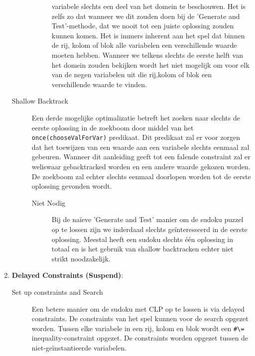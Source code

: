 \begin{enumerate}
\begin{description}
\begin{description}
                        variabele slechts een deel van het domein te beschouwen. Het is zelfs zo
                        dat wanneer we dit zouden doen bij de 'Generate and Test'-methode, dat we
                        nooit tot een juiste oplossing zouden kunnen komen. Het is immers inherent
                        aan het spel dat binnen de rij, kolom of blok alle variabelen een verschillende
                        waarde moeten hebben. Wanneer we telkens slechts de eerste helft van het domein
                        zouden bekijken wordt het niet mogelijk om voor elk van de negen variabelen
                        uit die rij,kolom of blok een verschillende waarde te vinden.
                \end{description}
        \item[Shallow Backtrack]
                Een derde mogelijke optimalizatie betreft het zoeken naar slechts de eerste oplossing in 
                de zoekboom door middel van het \verb|once(chooseValForVar)| predikaat. Dit predikaat
                zal er voor zorgen dat het toewijzen van een waarde aan een variabele slechts eenmaal
                zal gebeuren. Wanneer dit aanleiding geeft tot een falende constraint zal er weliswaar
                gebacktracked worden en een andere waarde gekozen worden. De zoekboom zal echter
                slechts eenmaal doorlopen worden tot de eerste oplossing gevonden wordt.
                \begin{description}
                \item[Niet Nodig] Bij de na\"ieve 'Generate and Test' manier om de sudoku puzzel op te lossen zijn we inderdaad slechts ge\"interesseerd
                        in de eerste oplossing. Meestal heeft een sudoku slechts \'e\'en oplossing in totaal
                        en is het gebruik van shallow backtracken echter niet strikt noodzakelijk.
                \end{description}
        \end{description}
 \item \textbf{Delayed Constraints (Suspend)}:
        \begin{description}
         \item[Set up constraints and Search]
        Een betere manier om de sudoku met CLP op te lossen is via delayed constraints.
        De constraints van het spel kunnen voor de search opgezet worden. Tussen elke
        variabele in een rij, kolom en blok wordt een \verb|#\=| inequality-constraint opgezet. De
        constraints worden opgezet tussen de niet-ge\"instantieerde variabelen.

\end{description}
\end{enumerate}
